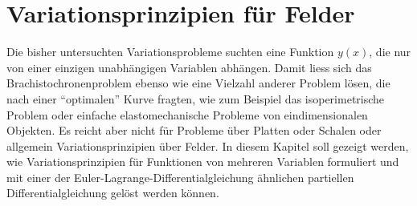 %
%
%
\chapter{Variationsprinzipien für Felder
\label{buch:chapter:felder}}
Die bisher untersuchten Variationsprobleme suchten eine Funktion
$y(x)$, die nur von einer einzigen unabhängigen Variablen abhängen.
Damit liess sich das Brachistochronenproblem ebenso wie eine
Vielzahl anderer Problem lösen, die nach einer ``optimalen''
Kurve fragten, wie zum Beispiel das isoperimetrische Problem
oder einfache elastomechanische Probleme von eindimensionalen
Objekten.
Es reicht aber nicht für Probleme über Platten oder Schalen oder
allgemein Variationsprinzipien über Felder.
In diesem Kapitel soll gezeigt werden, wie Variationsprinzipien
für Funktionen von mehreren Variablen formuliert und mit einer
der Euler-Lagrange-Differentialgleichung ähnlichen partiellen
Differentialgleichung gelöst werden können.





\uebungsabschnitt

\begin{uebungsaufgaben}
\end{uebungsaufgaben}
\enduebungsabschnitt

